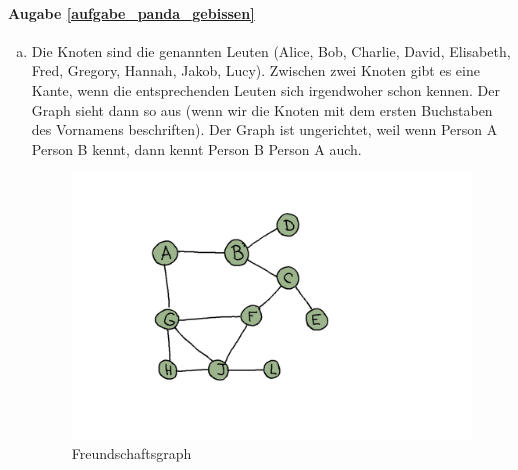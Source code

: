 \paragraph{Augabe \ref{aufgabe_panda_gebissen}}
\begin{enumerate}[(a)]
\item Die Knoten sind die genannten Leuten (Alice, Bob, Charlie, David, Elisabeth, Fred, Gregory, Hannah, Jakob, Lucy). Zwischen zwei Knoten gibt es eine Kante, wenn die entsprechenden Leuten sich irgendwoher schon kennen. Der Graph sieht dann so aus (wenn wir die Knoten mit dem ersten Buchstaben des Vornamens beschriften). Der Graph ist ungerichtet, weil wenn Person A Person B kennt, dann kennt Person B Person A auch.
    \begin{figure}[H]
        \centering
        \includegraphics[width=\textwidth]{Pictures/SP/panda_gebissen_graph.png}
        \caption{Freundschaftsgraph}
    \end{figure}


\end{enumerate}
